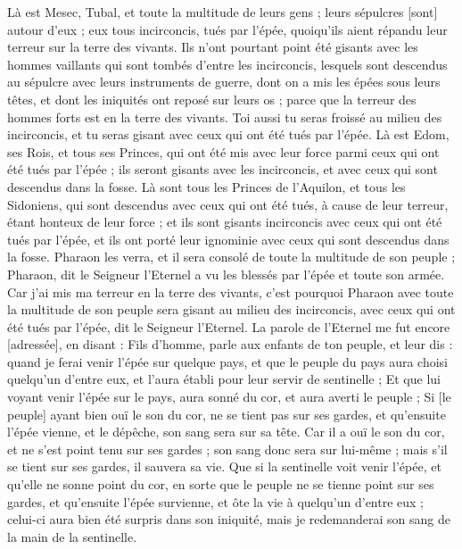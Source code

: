 \begin{multicols}{2}
Là est Mesec, Tubal, et toute la multitude de leurs gens ; leurs sépulcres [sont] autour d'eux ; eux tous incirconcis, tués par l'épée, quoiqu'ils aient répandu leur terreur sur la terre des vivants.
Ils n'ont pourtant point été gisants avec les hommes vaillants qui sont tombés d'entre les incirconcis, lesquels sont descendus au sépulcre avec leurs instruments de guerre, dont on a mis les épées sous leurs têtes, et dont les iniquités ont reposé sur leurs os ; parce que la terreur des hommes forts est en la terre des vivants.
Toi aussi tu seras froissé au milieu des incirconcis, et tu seras gisant avec ceux qui ont été tués par l'épée.
Là est Edom, ses Rois, et tous ses Princes, qui ont été mis avec leur force parmi ceux qui ont été tués par l'épée ; ils seront gisants avec les incirconcis, et avec ceux qui sont descendus dans la fosse.
Là sont tous les Princes de l'Aquilon, et tous les Sidoniens, qui sont descendus avec ceux qui ont été tués, à cause de leur terreur, étant honteux de leur force ; et ils sont gisants incirconcis avec ceux qui ont été tués par l'épée, et ils ont porté leur ignominie avec ceux qui sont descendus dans la fosse.
Pharaon les verra, et il sera consolé de toute la multitude de son peuple ; Pharaon, dit le Seigneur l'Eternel a vu les blessés par l'épée et toute son armée.
Car j'ai mis ma terreur en la terre des vivants, c'est pourquoi Pharaon avec toute la multitude de son peuple sera gisant au milieu des incirconcis, avec ceux qui ont été tués par l'épée, dit le Seigneur l'Eternel.
\VerseOne{}La parole de l'Eternel me fut encore [adressée], en disant :
Fils d'homme, parle aux enfants de ton peuple, et leur dis : quand je ferai venir l'épée sur quelque pays, et que le peuple du pays aura choisi quelqu'un d'entre eux, et l'aura établi pour leur servir de sentinelle ;
Et que lui voyant venir l'épée sur le pays, aura sonné du cor, et aura averti le peuple ;
Si [le peuple] ayant bien ouï le son du cor, ne se tient pas sur ses gardes, et qu'ensuite l'épée vienne, et le dépêche, son sang sera sur sa tête.
Car il a ouï le son du cor, et ne s'est point tenu sur ses gardes ; son sang donc sera sur lui-même ; mais s'il se tient sur ses gardes, il sauvera sa vie.
Que si la sentinelle voit venir l'épée, et qu'elle ne sonne point du cor, en sorte que le peuple ne se tienne point sur ses gardes, et qu'ensuite l'épée survienne, et ôte la vie à quelqu'un d'entre eux ; celui-ci aura bien été surpris dans son iniquité, mais je redemanderai son sang de la main de la sentinelle.

\end{multicols}

